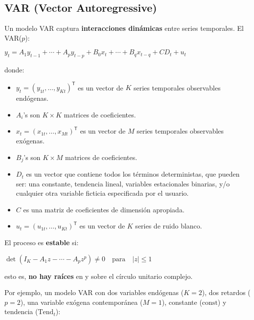 \documentclass[10pt, a4paper, landscape]{article}
\newcommand{\tr}{\mathsf{T}}
\begin{document}
	\begin{multicols}{2}
		\section*{VAR (Vector Autoregressive)}
		
		Un modelo VAR captura \textbf{interacciones dinámicas} entre series temporales. El VAR($p$):
		
		\begin{center}
			$y_{t} = A_{1} y_{t - 1}+ \cdots + A_{p} y_{t - p}+ B_{0} x_{t} + \cdots + B_{q} x_{t - q}+ CD_{t} + u_{t}$
		\end{center}
		
		donde:
		
		\begin{itemize}[leftmargin=*]
			\item $y_{t} = (y_{1t}, \ldots, y_{Kt})^{\tr}$ es un vector de $K$ series temporales observables endógenas.
			\item $A_{i}$'s son $K \times K$ matrices de coeficientes.
			\item $x_{t} = (x_{1t}, \ldots, x_{Mt})^{\tr}$ es un vector de $M$ series temporales observables exógenas.
			\item $B_{j}$'s son $K \times M$ matrices de coeficientes.
			\item $D_{t}$ es un vector que contiene todos los términos deterministas, que pueden ser: una constante, tendencia lineal, variables estacionales binarias, y/o cualquier otra variable ficticia especificada por el usuario.
			\item $C$ es una matriz de coeficientes de dimensión apropiada.
			\item $u_{t} = (u_{1t}, \ldots, u_{Kt})^{\tr}$ es un vector de $K$ series de ruido blanco.
		\end{itemize}
		
		El proceso es \textbf{estable} si:
		
		\begin{center}
			$\det(I_{K} - A_{1} z - \cdots - A_{p} z^{p}) \neq 0 \quad \mathrm{para}\quad \lvert z \rvert \leq 1$
		\end{center}
		
		\quad esto es, \textbf{no hay raíces} en y sobre el círculo unitario complejo.
		
		Por ejemplo, un modelo VAR con dos variables endógenas ($K = 2$), dos retardos ($p = 2$), una variable exógena contemporánea ($M = 1$), constante ($\mathrm{const}$) y tendencia ($\mathrm{Tend}_{t}$):
		

\end{multicols}
\end{document}
